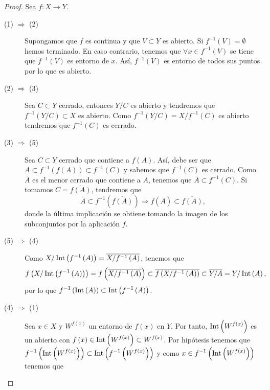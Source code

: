 \begin{proof}
Sea $\displaystyle f : X \to Y $.
\begin{description}
\item[(1) $\displaystyle \Rightarrow $ (2)] Supongamos que $\displaystyle f $ es continua y que $\displaystyle V \subset Y $ es abierto. Si $\displaystyle f^{-1}\left(V\right) = \emptyset$ hemos terminado. En caso contrario, tenemos que $\displaystyle \forall x \in f^{-1}\left(V\right) $ se tiene que $\displaystyle f^{-1}\left(V\right) $ es entorno de $\displaystyle x $. Así, $\displaystyle f^{-1}\left(V\right) $ es entorno de todos sus puntos por lo que es abierto. 
\item[(2) $\displaystyle \Rightarrow $ (3)] Sea $\displaystyle C \subset Y $ cerrado, entonces $\displaystyle Y/C $ es abierto y tendremos que $\displaystyle f^{-1}\left(Y/C\right)\subset X $ es abierto. Como $\displaystyle f^{-1}\left(Y/C\right)=X/f^{-1}\left(C\right) $ es abierto tendremos que $\displaystyle f^{-1}\left(C\right) $ es cerrado.
\item[(3) $\displaystyle \Rightarrow $ (5)] Sea $\displaystyle C\subset Y $ cerrado que contiene a $\displaystyle f\left(A\right) $. Así, debe ser que $\displaystyle A \subset f^{-1}\left(f\left(A\right)\right)\subset f^{-1}\left(C\right) $ y sabemos que $\displaystyle f^{-1}\left(C\right) $ es cerrado. Como $\displaystyle \overline{A} $ es el menor cerrado que contiene a $\displaystyle A $, tenemos que $\displaystyle \overline{A}\subset f^{-1}\left(C\right) $. Si tomamos $\displaystyle C = \overline{f\left(A\right)} $, tendremos que 
	\[\overline{A}\subset f^{-1}\left(\overline{f\left(A\right)}\right)\Rightarrow f\left(\overline{A}\right)\subset\overline{f\left(A\right)} ,\]
	donde la última implicación se obtiene tomando la imagen de los subconjuntos por la aplicación $\displaystyle f $. 
\item[(5) $\displaystyle \Rightarrow $ (4)] Como $\displaystyle X/\operatorname{Int}\left(f^{-1}\left(A\right)\right)=\overline{X/f^{-1}\left(A\right)} $, tenemos que 
	\[f\left(X / \operatorname{Int}\left(f^{-1}\left(A\right)\right)\right)=f\left(\overline{X/f^{-1}\left(A\right)}\right)\subset \overline{f\left(X/f^{-1}\left(A\right)\right)}\subset\overline{Y/A}=Y/\operatorname{Int}\left(A\right) ,\]
	por lo que $\displaystyle f^{-1}\left(\operatorname{Int}\left(A\right)\right)\subset\operatorname{Int}\left(f^{-1}\left(A\right)\right) $. 
\item[(4) $\displaystyle \Rightarrow $ (1)] Sea $\displaystyle x \in X $ y $\displaystyle W^{f\left(x\right)} $ un entorno de $\displaystyle f\left(x\right) $ en $\displaystyle Y $. Por tanto, $\displaystyle \operatorname{Int}\left(W^{f\left(x\right)}\right) $ es un abierto con $\displaystyle f\left(x\right)\in \operatorname{Int}\left(W^{f\left(x\right)}\right)\subset W^{f\left(x\right)} $. Por hipótesis tenemos que $\displaystyle f^{-1}\left(\operatorname{Int}\left(W^{f\left(x\right)}\right)\right)\subset \operatorname{Int}\left(f^{-1}\left(W^{f\left(x\right)}\right)\right) $ y como $\displaystyle x \in f^{-1}\left(\operatorname{Int}\left(W^{f\left(x\right)}\right)\right) $ tenemos que 

\end{description}
\end{proof}
